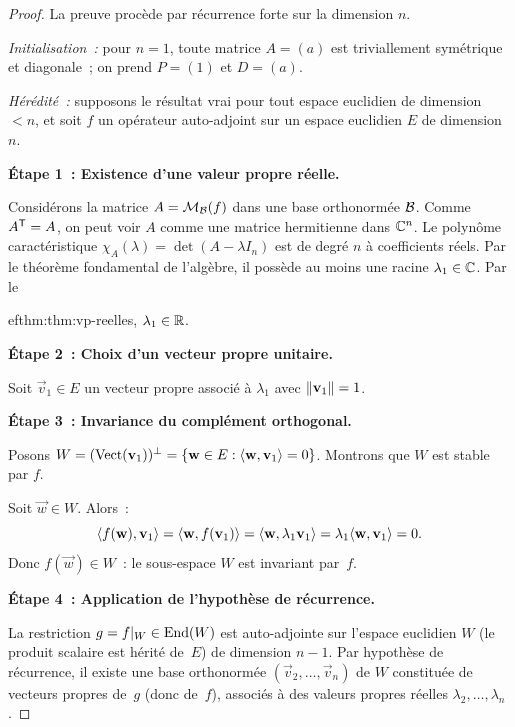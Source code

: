 \begin{proof}
  La preuve procède par récurrence forte sur la
  dimension $n$.

  \medskip
  \noindent\emph{Initialisation~:} pour $n = 1$, toute matrice $A = (a)$
  est triviallement symétrique et diagonale~; on prend $P = (1)$ et
  $D = (a)$.

  \medskip
  \noindent\emph{Hérédité~:} supposons le résultat vrai pour tout espace
  euclidien de dimension $< n$, et soit $f$ un opérateur auto-adjoint sur
  un espace euclidien $E$ de dimension~$n$.

  \medskip
  \noindent\textbf{Étape 1~: Existence d'une valeur propre réelle.}

  Considérons la matrice $A = \mathcal{M}_{\mathcal{B}}(f)$ dans une base orthonormée
  ${\mathcal{B}}$. Comme ${A}^{\mathsf{T}} = A$, on peut voir $A$ comme une matrice
  hermitienne dans ${\mathbb{C}}^n$. Le polynôme caractéristique
  $\chi_A(\lambda) = \det(A - \lambda I_n)$ est de degré $n$ à
  coefficients réels. Par le théorème fondamental de l'algèbre, il
  possède au moins une racine $\lambda_1 \in {\mathbb{C}}$. Par le
  
ef{thm:thm:vp-reelles}, $\lambda_1 \in {\mathbb{R}}$.

  \medskip
  \noindent\textbf{Étape 2~: Choix d'un vecteur propre unitaire.}

  Soit $\vec{v}_1 \in E$ un vecteur propre associé à $\lambda_1$ avec
  $\lVert\mathbf{v}_1\rVert = 1$.

  \medskip
  \noindent\textbf{Étape 3~: Invariance du complément orthogonal.}

  Posons $W = (\operatorname{Vect}(\mathbf{v}_1))^\perp = \left\{\mathbf{w} \in E :
  \langle\mathbf{w}, \mathbf{v}_1\rangle = 0\right\}$. Montrons que $W$ est stable par $f$.

  Soit $\vec{w} \in W$. Alors~:
  \[
    \langle f(\mathbf{w}), \mathbf{v}_1\rangle
    = \langle\mathbf{w}, f(\mathbf{v}_1)\rangle
    = \langle\mathbf{w}, \lambda_1 \mathbf{v}_1\rangle
    = \lambda_1 \langle\mathbf{w}, \mathbf{v}_1\rangle = 0.
  \]
  Donc $f(\vec{w}) \in W$~: le sous-espace $W$ est invariant par~$f$.

  \medskip
  \noindent\textbf{Étape 4~: Application de l'hypothèse de récurrence.}

  La restriction $g = f{|_{W}} \in \operatorname{End}(W)$ est auto-adjointe sur
  l'espace euclidien $W$ (le produit scalaire est hérité de~$E$) de
  dimension $n - 1$. Par hypothèse de récurrence, il existe une base
  orthonormée $(\vec{v}_2, \ldots, \vec{v}_n)$ de $W$ constituée de
  vecteurs propres de~$g$ (donc de~$f$), associés à des valeurs propres
  réelles $\lambda_2, \ldots, \lambda_n$.


\end{proof}
